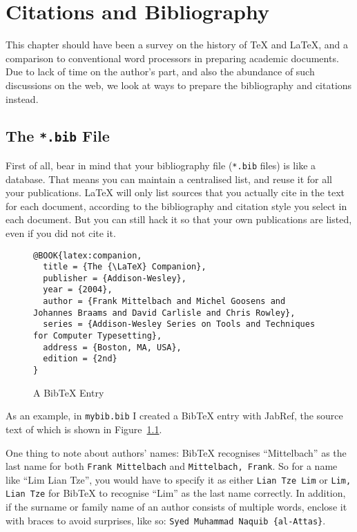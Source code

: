 \chapter{Citations and Bibliography}\label{chap:review}

This chapter should have been a survey on the history of \TeX{} and \LaTeX{}, and a comparison to conventional word processors in preparing academic documents.  Due to lack of time on the author's part, and also the abundance of such discussions on the web, we look at ways to prepare the bibliography and citations instead.

\section{The \texttt{*.bib} File}
First of all, bear in mind that your bibliography file (\verb|*.bib| files) is like a database.  That means you can maintain a centralised list, and reuse it for all your publications.  \LaTeX{} will only list sources that you actually cite in the text for each document, according to the bibliography and citation style you select in each document.  But you can still hack it so that your own publications are listed, even if you did not cite it.
 

\begin{figure}[htb!]
\begin{lstlisting}[language={}]
@BOOK{latex:companion,
  title = {The {\LaTeX} Companion},
  publisher = {Addison-Wesley},
  year = {2004},
  author = {Frank Mittelbach and Michel Goosens and Johannes Braams and David Carlisle and Chris Rowley},
  series = {Addison-Wesley Series on Tools and Techniques for Computer Typesetting},
  address = {Boston, MA, USA},
  edition = {2nd}
}
\end{lstlisting}
\caption{A BibTeX Entry}\label{fig:bibtex}
\end{figure}

As an example, in \verb|mybib.bib| I created a Bib\TeX{} entry with JabRef, the source text of which is shown in Figure~\ref{fig:bibtex}.

One thing to note about authors' names: Bib\TeX{} recognises ``Mittelbach'' as the last name for both \texttt{Frank Mittelbach} and \texttt{Mittelbach, Frank}.  So for a name like ``Lim Lian Tze'', you would have to specify it as either \texttt{Lian Tze Lim} or \texttt{Lim, Lian Tze} for Bib\TeX{} to recognise ``Lim'' as the last name correctly.  In addition, if the surname or family name of an author consists of multiple words, enclose it with braces to avoid surprises, like so: \texttt{Syed Muhammad Naquib \{al-Attas\}}.

